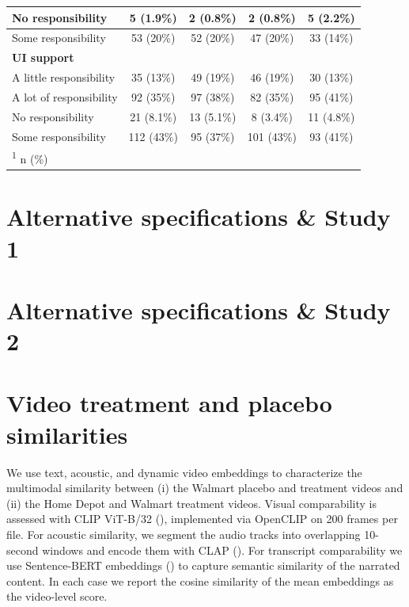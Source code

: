 \documentclass[
  11pt,
  oneside]{article}
\begin{document}
\begin{table}
\begin{tabular}[t]{l|c|c|c|c}
\hline
\hspace{1em}No responsibility & 5 (1.9\%) & 2 (0.8\%) & 2 (0.8\%) & 5 (2.2\%)\\
\hline
\hspace{1em}Some responsibility & 53 (20\%) & 52 (20\%) & 47 (20\%) & 33 (14\%)\\
\hline
\textbf{UI support} &  &  &  & \\
\hline
\hspace{1em}A little responsibility & 35 (13\%) & 49 (19\%) & 46 (19\%) & 30 (13\%)\\
\hline
\hspace{1em}A lot of responsibility & 92 (35\%) & 97 (38\%) & 82 (35\%) & 95 (41\%)\\
\hline
\hspace{1em}No responsibility & 21 (8.1\%) & 13 (5.1\%) & 8 (3.4\%) & 11 (4.8\%)\\
\hline
\hspace{1em}Some responsibility & 112 (43\%) & 95 (37\%) & 101 (43\%) & 93 (41\%)\\
\hline
\multicolumn{5}{l}{\rule{0pt}{1em}\textsuperscript{1} n (\%)}\\
\end{tabular}
\end{table}

\newpage

\section{Alternative specifications \& Study 1}\label{alternative-specifications-study-1}

\section{Alternative specifications \& Study 2}\label{alternative-specifications-study-2}

\section{Video treatment and placebo similarities}\label{app-vidsim}

We use text, acoustic, and dynamic video embeddings to characterize the multimodal similarity between (i) the Walmart placebo and treatment videos and (ii) the Home Depot and Walmart treatment videos. Visual comparability is assessed with CLIP ViT-B/32 (), implemented via OpenCLIP on 200 frames per file. For acoustic similarity, we segment the audio tracks into overlapping 10-second windows and encode them with CLAP (). For transcript comparability we use Sentence-BERT embeddings () to capture semantic similarity of the narrated content. In each case we report the cosine similarity of the mean embeddings as the video-level score.
\end{document}
